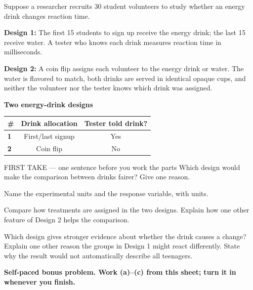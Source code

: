 \documentclass[14pt]{extarticle}
\begin{document}
\pagestyle{empty}


\noindent\begin{minipage}[t]{0.57\linewidth}
\vspace{0pt}
Suppose a researcher recruits 30 student volunteers to study whether an energy drink changes reaction time.\par\smallskip \textbf{Design 1:} The first 15 students to sign up receive the energy drink; the last 15 receive water. A tester who knows each drink measures reaction time in milliseconds.\par \textbf{Design 2:} A coin flip assigns each volunteer to the energy drink or water. The water is flavored to match, both drinks are served in identical opaque cups, and neither the volunteer nor the tester knows which drink was assigned.\par
\end{minipage}\hfill
\begin{minipage}[t]{0.40\linewidth}
\vspace{0pt}
\begin{center}
\textbf{Two energy-drink designs}\par\smallskip
\begin{tabular}{|l|c|c|}
\hline
\textbf{\#} & \textbf{Drink allocation} & \textbf{Tester told drink?} \\ \hline
\textbf{1} & First/last signup & Yes \\ \hline
\textbf{2} & Coin flip & No \\ \hline
\end{tabular}
\end{center}
\end{minipage}

\begin{firsttakebox}{FIRST TAKE --- one sentence before you work the parts}
Which design would make the comparison between drinks fairer? Give one reason.
\end{firsttakebox}

\begin{description}[leftmargin=1.15in, labelwidth=1in, itemsep=2pt, topsep=2pt]
  \item[\dokbadge{1}~(a)] Name the experimental units and the response variable, with units.
  \item[\dokbadge{2}~(b)] Compare how treatments are assigned in the two designs. Explain how one other feature of Design 2 helps the comparison.
  \item[\dokbadge{3}~(c)] Which design gives stronger evidence about whether the drink causes a change? Explain one other reason the groups in Design 1 might react differently. State why the result would not automatically describe all teenagers.
\end{description}

\vfill
\textbf{Self-paced bonus problem. Work (a)--(c) from this sheet; turn it in whenever you finish.}
\end{document}

